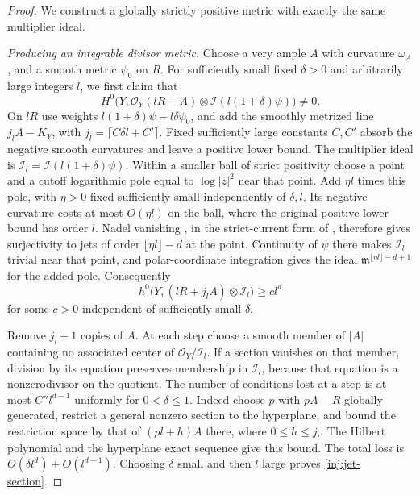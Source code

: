 \begin{proof}
We construct a globally strictly positive metric with exactly the same
multiplier ideal.

\smallskip\noindent\textit{Producing an integrable divisor metric.}
Choose a very ample $A$ with curvature $\omega_A$,
and a smooth metric $\psi_0$ on $R$.  For sufficiently small fixed
$\delta>0$ and arbitrarily large integers $l$, we first claim that
\begin{equation}\label{inj:jet-section}
 H^0\bigl(Y,\mathcal O_Y(lR-A)\otimes
       \mathcal I(l(1+\delta)\psi)\bigr)\ne0.
\end{equation}
On $lR$ use weights $l(1+\delta)\psi-l\delta\psi_0$, and add the
smoothly metrized line $j_lA-K_Y$, with
$j_l=\lceil C\delta l+C'\rceil$.  Fixed sufficiently large constants
$C,C'$ absorb the negative smooth curvatures and leave a positive
lower bound.  The multiplier ideal is
$\mathcal I_l=\mathcal I(l(1+\delta)\psi)$.
Within a smaller ball of strict positivity choose a point and a cutoff
logarithmic pole equal to $\log|z|^2$ near that point.  Add $\eta l$
times this pole, with $\eta>0$ fixed sufficiently small independently
of $\delta,l$.  Its negative curvature costs at most $O(\eta l)$
on the ball, where the original positive lower bound has order $l$.
Nadel vanishing \cite{Nadel1990}, in the strict-current form of
\cite[Theorem~5.11]{Demailly2011}, therefore gives surjectivity to jets
of order $\lfloor\eta l\rfloor-d$ at the point.  Continuity of
$\psi$ there makes $\mathcal I_l$ trivial near that point, and
polar-coordinate integration gives the ideal
$\mathfrak m^{\lfloor\eta l\rfloor-d+1}$ for the added pole.
Consequently
\[
 h^0\bigl(Y,(lR+j_lA)\otimes\mathcal I_l\bigr)\ge c l^d
\]
for some $c>0$ independent of sufficiently small $\delta$.

Remove $j_l+1$ copies of $A$.  At each step choose a smooth member of
$|A|$ containing no associated center of $\mathcal O_Y/\mathcal I_l$.
If a section vanishes on that member, division by its equation
preserves membership in $\mathcal I_l$, because that equation is a
nonzerodivisor on the quotient.  The number of conditions lost at a
step is at most $C''l^{d-1}$ uniformly for $0<\delta\le1$.
Indeed choose $p$ with $pA-R$ globally generated, restrict a general
nonzero section to the hyperplane, and bound the restriction space by
that of $(pl+h)A$ there, where $0\le h\le j_l$.  The Hilbert
polynomial and the hyperplane exact sequence give this bound.
The total loss is $O(\delta l^d)+O(l^{d-1})$.  Choosing $\delta$
small and then $l$ large proves \eqref{inj:jet-section}.


\end{proof}
